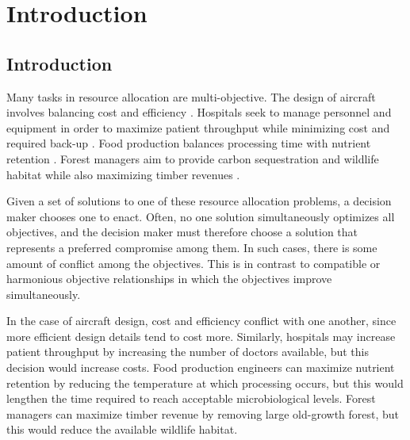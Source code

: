 \chapter{Introduction}
\section{Introduction}
\label{sec:intro}

Many tasks in resource allocation are multi-objective. The design of aircraft involves balancing cost and efficiency \cite{wang2014multi}. Hospitals seek to manage personnel and equipment in order to maximize patient throughput while minimizing cost and required back-up \cite{hutzschenreuter2009evolutionary}. Food production balances processing time with nutrient retention \cite{sendin2010efficient}. Forest managers aim to provide carbon sequestration and wildlife habitat while also maximizing timber revenues \cite{toth2013ecosel}.

Given a set of solutions to one of these resource allocation problems, a decision maker chooses one to enact. Often, no one solution simultaneously optimizes all objectives, and the decision maker must therefore choose a solution that represents a preferred compromise among them. In such cases, there is some amount of conflict among the objectives. This is in contrast to compatible or harmonious objective relationships in which the objectives improve simultaneously.

In the case of aircraft design, cost and efficiency conflict with one another, since more efficient design details tend to cost more. Similarly, hospitals may increase patient throughput by increasing the number of doctors available, but this decision would increase costs. Food production engineers can maximize nutrient retention by reducing the temperature at which processing occurs, but this would lengthen the time required to reach acceptable microbiological levels. Forest managers can maximize timber revenue by removing large old-growth forest, but this would reduce the available wildlife habitat.

